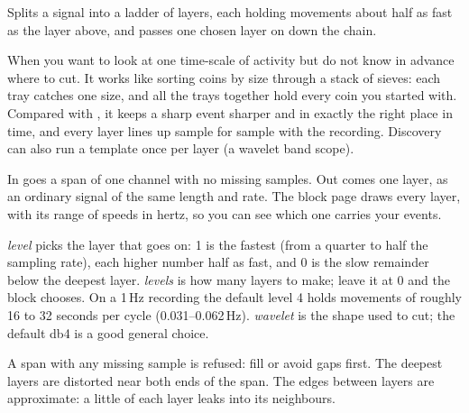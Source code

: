Splits a signal into a ladder of layers, each holding movements about half as fast as the
layer above, and passes one chosen layer on down the chain.

When you want to look at one time-scale of activity but do not know in advance where to cut.
It works like sorting coins by size through a stack of sieves: each tray catches one size, and
all the trays together hold every coin you started with. Compared with
, it keeps a sharp event sharper and in exactly the right
place in time, and every layer lines up sample for sample with the recording. Discovery can
also run a template once per layer (a wavelet band scope).

In goes a span of one channel with no missing samples. Out comes one layer, as an ordinary
signal of the same length and rate. The block page draws every layer, with its range of
speeds in hertz, so you can see which one carries your events.

\emph{level} picks the layer that goes on: 1 is the fastest (from a quarter to half the
sampling rate), each higher number half as fast, and 0 is the slow remainder below the deepest
layer. \emph{levels} is how many layers to make; leave it at 0 and the block chooses. On a
1\,Hz recording the default level 4 holds movements of roughly 16 to 32 seconds per cycle
(0.031--0.062\,Hz). \emph{wavelet} is the shape used to cut; the default db4 is a good
general choice.

A span with any missing sample is refused: fill or avoid gaps first. The deepest layers are
distorted near both ends of the span. The edges between layers are approximate: a little of
each layer leaks into its neighbours.
